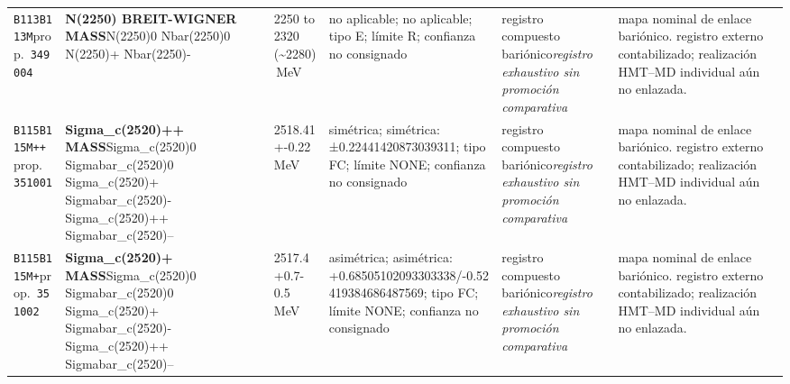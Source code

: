 \begin{landscape}
\begin{longtable}{L{1.85cm}L{4.45cm}L{2.35cm}L{4.05cm}L{3.35cm}L{7.15cm}}
\texttt{B113}\newline \texttt{B113M}\newline prop.\ \texttt{349004} & \textbf{N(2250) BREIT-WIGNER MASS}\newline N(2250)0 \textbar{}\allowbreak{} Nbar(2250)0 \textbar{}\allowbreak{} N(2250)+ \textbar{}\allowbreak{} Nbar(2250)- & 2250 to 2320 (\textasciitilde{}2280)\,MeV & no aplicable; no aplicable; tipo E; límite R; confianza no consignado & registro compuesto bariónico\newline \emph{registro exhaustivo sin promoción comparativa} & mapa nominal de enlace bariónico. registro externo contabilizado; realización HMT--MD individual aún no enlazada. \\
\texttt{B115}\newline \texttt{B115M++}\newline prop.\ \texttt{351001} & \textbf{Sigma\_\allowbreak{}c(2520)++ MASS}\newline Sigma\_\allowbreak{}c(2520)0 \textbar{}\allowbreak{} Sigmabar\_\allowbreak{}c(2520)0 \textbar{}\allowbreak{} Sigma\_\allowbreak{}c(2520)+ \textbar{}\allowbreak{} Sigmabar\_\allowbreak{}c(2520)- \textbar{}\allowbreak{} Sigma\_\allowbreak{}c(2520)++ \textbar{}\allowbreak{} Sigmabar\_\allowbreak{}c(2520)-- & 2518.41+-0.22\,MeV & simétrica; simétrica: ±0.22441420873039311; tipo FC; límite NONE; confianza no consignado & registro compuesto bariónico\newline \emph{registro exhaustivo sin promoción comparativa} & mapa nominal de enlace bariónico. registro externo contabilizado; realización HMT--MD individual aún no enlazada. \\
\texttt{B115}\newline \texttt{B115M+}\newline prop.\ \texttt{351002} & \textbf{Sigma\_\allowbreak{}c(2520)+ MASS}\newline Sigma\_\allowbreak{}c(2520)0 \textbar{}\allowbreak{} Sigmabar\_\allowbreak{}c(2520)0 \textbar{}\allowbreak{} Sigma\_\allowbreak{}c(2520)+ \textbar{}\allowbreak{} Sigmabar\_\allowbreak{}c(2520)- \textbar{}\allowbreak{} Sigma\_\allowbreak{}c(2520)++ \textbar{}\allowbreak{} Sigmabar\_\allowbreak{}c(2520)-- & 2517.4+0.7-0.5\,MeV & asimétrica; asimétrica: +0.68505102093303338/-0.52419384686487569; tipo FC; límite NONE; confianza no consignado & registro compuesto bariónico\newline \emph{registro exhaustivo sin promoción comparativa} & mapa nominal de enlace bariónico. registro externo contabilizado; realización HMT--MD individual aún no enlazada. \\

\end{longtable}
\end{landscape}
